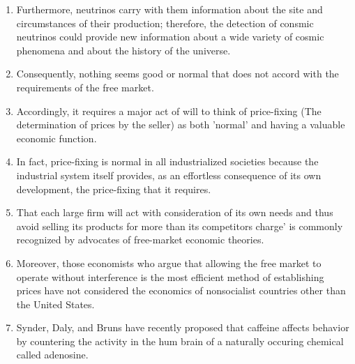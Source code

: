 \begin{enumerate}
\item Furthermore, neutrinos carry with them information about the site and circumstances of their production; therefore, the detection of consmic neutrinos could provide new information about a wide variety of cosmic phenomena and about the history of the universe.

\item Consequently, nothing seems good or normal that does not accord with the requirements of the free market.

\item Accordingly, it requires a major act of will to think of price-fixing (The determination of prices by the seller) as both 'normal' and having a valuable economic function.

\item In fact, price-fixing is normal in all industrialized societies because the industrial system itself provides, as an effortless consequence of its own development, the price-fixing that it requires.

\item That each large firm will act with consideration of its own needs and thus avoid selling its products for more than its competitors charge' is commonly recognized by advocates of free-market economic theories.

\item Moreover, those economists who argue that allowing the free market to operate without interference is the most efficient method of establishing prices have not considered the economics of nonsocialist countries other than the United States.

\item Synder, Daly, and Bruns have recently proposed that caffeine affects behavior by countering the activity in the hum brain of a naturally occuring chemical called adenosine.




\end{enumerate}

